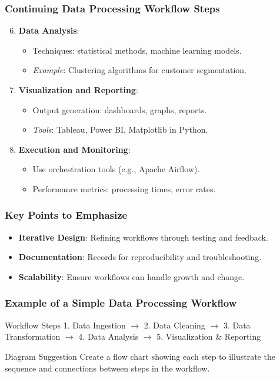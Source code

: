 \documentclass[aspectratio=169]{beamer}
\begin{document}
\begin{frame}[fragile]
    \frametitle{Continuing Data Processing Workflow Steps}
    \begin{enumerate}
        \setcounter{enumi}{5} %
        \item \textbf{Data Analysis}:
        \begin{itemize}
            \item Techniques: statistical methods, machine learning models.
            \item \textit{Example}: Clustering algorithms for customer segmentation.
        \end{itemize}

        \item \textbf{Visualization and Reporting}:
        \begin{itemize}
            \item Output generation: dashboards, graphs, reports.
            \item \textit{Tools}: Tableau, Power BI, Matplotlib in Python.
        \end{itemize}
        
        \item \textbf{Execution and Monitoring}:
        \begin{itemize}
            \item Use orchestration tools (e.g., Apache Airflow).
            \item Performance metrics: processing times, error rates.
        \end{itemize}
    \end{enumerate}
\end{frame}

\begin{frame}[fragile]
    \frametitle{Key Points to Emphasize}
    \begin{itemize}
        \item \textbf{Iterative Design}: Refining workflows through testing and feedback.
        \item \textbf{Documentation}: Records for reproducibility and troubleshooting.
        \item \textbf{Scalability}: Ensure workflows can handle growth and change.
    \end{itemize}
\end{frame}

\begin{frame}[fragile]
    \frametitle{Example of a Simple Data Processing Workflow}
    \begin{block}{Workflow Steps}
        1. Data Ingestion $\rightarrow$ 2. Data Cleaning $\rightarrow$ 3. Data Transformation $\rightarrow$ 4. Data Analysis $\rightarrow$ 5. Visualization \& Reporting
    \end{block}
    
    \begin{block}{Diagram Suggestion}
        Create a flow chart showing each step to illustrate the sequence and connections between steps in the workflow.
    \end{block}
\end{frame}
\end{document}
